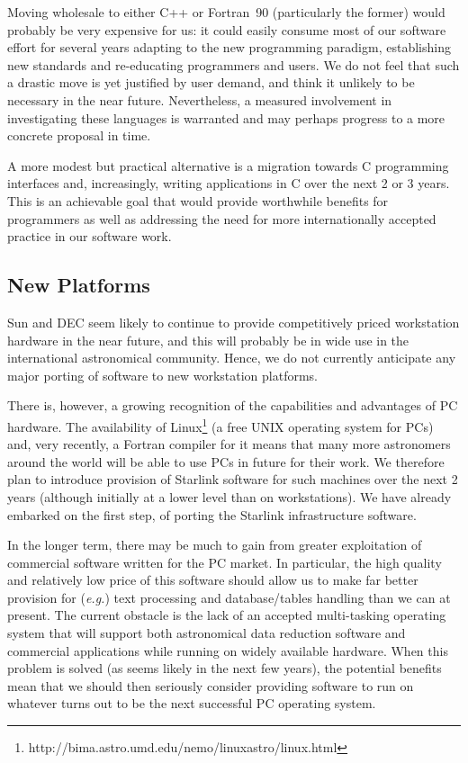 \documentclass[twoside,11pt]{article}
\newcommand{\htmladdnormallinkfoot}[2]{#1\footnote{#2}}
\newcommand{\st}[1]{{\em{#1}}}
\newcommand{\linuxurl}[0]{http://bima.astro.umd.edu/nemo/linuxastro/linux.html}
\begin{document}
Moving wholesale to either C++ or Fortran~90 (particularly the former)
would probably be very expensive for us: it could easily consume most
of our software effort for several years adapting to the new
programming paradigm, establishing new standards and re-educating
programmers and users. We do not feel that such a drastic move is yet
justified by user demand, and think it unlikely to be necessary in the
near future. Nevertheless, a measured involvement in investigating
these languages is warranted and may perhaps progress to a more
concrete proposal in time.

A more modest but practical alternative is a migration towards C
programming interfaces and, increasingly, writing applications in C
over the next 2 or 3 years. This is an achievable goal that would
provide worthwhile benefits for programmers as well as addressing the
need for more internationally accepted practice in our software work.

\subsection{New Platforms}

Sun and DEC seem likely to continue to provide competitively priced
workstation hardware in the near future, and this will probably be in
wide use in the international astronomical community. Hence, we do not
currently anticipate any major porting of software to new workstation
platforms.

There is, however, a growing recognition of the capabilities and
advantages of PC hardware. The availability of
\htmladdnormallinkfoot{Linux}{\linuxurl} (a free UNIX operating system
for PCs) and, very recently, a Fortran compiler for it means that many
more astronomers around the world will be able to use PCs in future
for their work. We therefore plan to introduce provision of Starlink
software for such machines over the next 2 years (although initially
at a lower level than on workstations). We have already embarked on
the first step, of porting the Starlink infrastructure software.

In the longer term, there may be much to gain from greater
exploitation of commercial software written for the PC market. In
particular, the high quality and relatively low price of this software
should allow us to make far better provision for (\st{e.g.}) text
processing and database/tables handling than we can at present. The
current obstacle is the lack of an accepted multi-tasking operating
system that will support both astronomical data reduction software and
commercial applications while running on widely available hardware.
When this problem is solved (as seems likely in the next few years),
the potential benefits mean that we should then seriously consider
providing software to run on whatever turns out to be the next
successful PC operating system.
\end{document}
